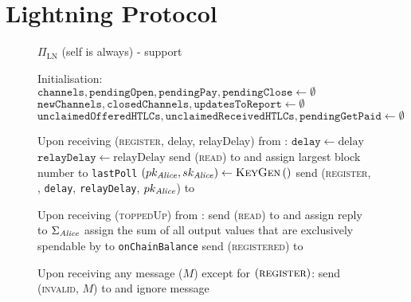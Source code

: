\section{Lightning Protocol}
  \label{appendix:protocol}
  \begin{figure}[H]
    \begin{protocolbox}{$\Pi_{\mathrm{LN}}$ (self is \alice{} always) - support}
      \begin{algorithmic}[1]
        \State Initialisation:
        \Indent
          \State $\mathtt{channels}, \mathtt{pendingOpen}, \mathtt{pendingPay},
          \mathtt{pendingClose} \gets \emptyset$
          \State $\mathtt{newChannels}, \mathtt{closedChannels},
          \mathtt{updatesToReport} \gets \emptyset$
          \State $\mathtt{unclaimedOfferedHTLCs},
          \mathtt{unclaimedReceivedHTLCs}, \mathtt{pendingGetPaid} \gets
          \emptyset$
        \EndIndent
        \Statex

        \State Upon receiving (\textsc{register}, delay, relayDelay) from
        \environment:
        \Indent
          \State $\mathtt{delay} \gets \mathrm{delay}$ 
          \label{alg:protocol:support:delay}
          \State $\mathtt{relayDelay} \gets \mathrm{relayDelay}$
          \State send (\textsc{read}) to \ledger{} and assign largest block
          number to \texttt{lastPoll} %
          \label{alg:protocol:support:lastpoll}
          \State $\left(pk_{\mathit{Alice}}, sk_{\mathit{Alice}}\right) \gets
          \textsc{KeyGen}\left(\right)$
          \label{alg:protocol:support:keygen}
          \State send (\textsc{register}, \alice, \texttt{delay},
          \texttt{relayDelay}, $pk_{\mathit{Alice}}$) to \environment
        \EndIndent
        \Statex

        \State Upon receiving (\textsc{toppedUp}) from \environment:
        \Indent
          \State send (\textsc{read}) to \ledger{} and assign reply to
          $\Sigma_{\mathit{Alice}}$
          \State assign the sum of all output values that are exclusively
          spendable by \alice{} to \texttt{onChainBalance}
          \State send (\textsc{registered}) to \environment
        \EndIndent
        \Statex

        \State Upon receiving any message ($M$) except for
        $\left(\textsc{register}\right)$:
        \Indent
            \State send (\textsc{invalid}, $M$) to \environment{} and ignore
            message
          \EndIf
        \EndIndent
        \Statex


\end{algorithmic}
\end{protocolbox}
\end{figure}

